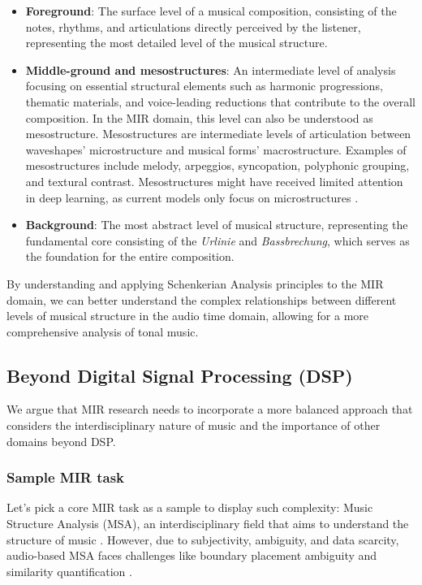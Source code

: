 \begin{itemize}
\item \textbf{Foreground}: The surface level of a musical composition, consisting of the notes, rhythms, and articulations directly perceived by the listener, representing the most detailed level of the musical structure.

\item \textbf{Middle-ground and mesostructures}: An intermediate level of analysis focusing on essential structural elements such as harmonic progressions, thematic materials, and voice-leading reductions that contribute to the overall composition. In the MIR domain, this level can also be understood as mesostructure. Mesostructures are intermediate levels of articulation between waveshapes' microstructure and musical forms' macrostructure. Examples of mesostructures include melody, arpeggios, syncopation, polyphonic grouping, and textural contrast. Mesostructures might have received limited attention in deep learning, as current models only focus on microstructures \cite{Mesostructures2023}.

\item \textbf{Background}: The most abstract level of musical structure, representing the fundamental core consisting of the \textit{Urlinie} and \textit{Bassbrechung}, which serves as the foundation for the entire composition.
\end{itemize}

By understanding and applying Schenkerian Analysis principles to the MIR domain, we can better understand the complex relationships between different levels of musical structure in the audio time domain, allowing for a more comprehensive analysis of tonal music.

\subsection{Beyond Digital Signal Processing (DSP)}

We argue that MIR research needs to incorporate a more balanced approach that considers the interdisciplinary nature of music and the importance of other domains beyond DSP.

\subsubsection{Sample MIR task}

Let's pick a core MIR task as a sample to display such complexity: Music Structure Analysis (MSA), an interdisciplinary field that aims to understand the structure of music \cite{Nieto2020Audio-BasedApplications}. However, due to subjectivity, ambiguity, and data scarcity, audio-based MSA faces challenges like boundary placement ambiguity and similarity quantification \cite{NietoPerceptualMusic}. 

